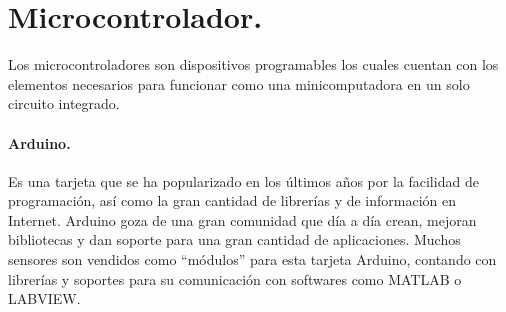 \section{Microcontrolador.}
Los microcontroladores son dispositivos programables los cuales cuentan con los elementos necesarios para funcionar como una minicomputadora en un solo circuito integrado. %


\paragraph{Arduino.} 
Es una tarjeta que se ha popularizado en los últimos años por la facilidad de programación, así como la gran cantidad de librerías y de información en Internet. Arduino goza de una gran comunidad que día a día crean, mejoran bibliotecas y dan soporte para una gran cantidad de aplicaciones. Muchos sensores son vendidos como ``módulos'' para esta tarjeta Arduino, contando con librerías y soportes para su comunicación con softwares como MATLAB o LABVIEW. 

